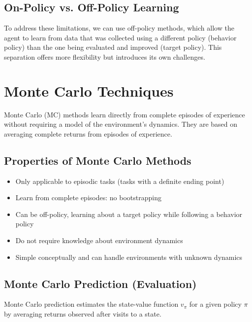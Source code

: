 \documentclass[11pt,a4paper]{article}
\begin{document}
\subsection{On-Policy vs. Off-Policy Learning}

To address these limitations, we can use off-policy methods, which allow the agent to learn from data that was collected using a different policy (behavior policy) than the one being evaluated and improved (target policy). This separation offers more flexibility but introduces its own challenges.

\section{Monte Carlo Techniques}

Monte Carlo (MC) methods learn directly from complete episodes of experience without requiring a model of the environment's dynamics. They are based on averaging complete returns from episodes of experience.

\subsection{Properties of Monte Carlo Methods}

\begin{itemize}
    \item Only applicable to episodic tasks (tasks with a definite ending point)
    \item Learn from complete episodes: no bootstrapping
    \item Can be off-policy, learning about a target policy while following a behavior policy
    \item Do not require knowledge about environment dynamics
    \item Simple conceptually and can handle environments with unknown dynamics
\end{itemize}

\subsection{Monte Carlo Prediction (Evaluation)}

Monte Carlo prediction estimates the state-value function $v_\pi$ for a given policy $\pi$ by averaging returns observed after visits to a state.
\end{document}
